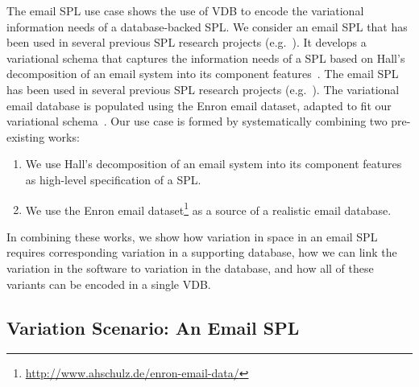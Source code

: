 The email SPL use case shows the use of VDB to encode the variational
information needs of a database-backed SPL. We consider an email
SPL that has been used in several previous SPL research projects (e.g.\
\cite{apel2013strategies,AlHaj19}).
It develops a variational
schema that captures the information needs of a SPL based on Hall's
decomposition of an email system into its component features~\cite{Hall05}. The
email SPL has been used in several previous SPL research projects (e.g.\
\cite{Apel13:SSP,AlHaj19}). The variational email database is populated using
the Enron email dataset, adapted to fit our variational schema~\cite{Shetty04}.
%
%
Our use case is formed by systematically combining two pre-existing works:
%
\begin{enumerate}
%
\item 
 We use Hall's decomposition of an email system into its component
features~\cite{Hall05} as high-level specification of a SPL.
%
\item 
 We use the Enron email
dataset\footnote{\url{http://www.ahschulz.de/enron-email-data/}} as 
a source of
a realistic email database.
%
\end{enumerate}
%
In combining these works, we show how variation in space in an email SPL
requires corresponding variation in a supporting database, how we can link the
variation in the software to variation in the database, and how all of these
variants can be encoded in a single VDB.


\subsection{Variation Scenario: An Email SPL}
\label{sec:enron-scenario}


